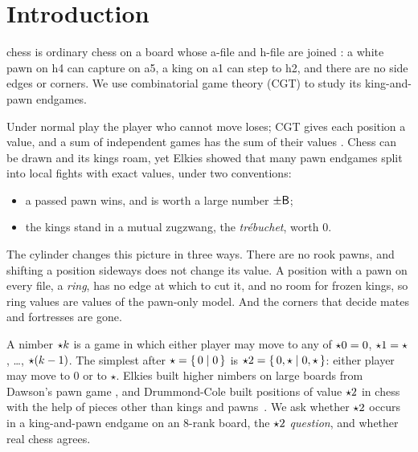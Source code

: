 \section{Introduction}\label{sec:intro}

 chess is ordinary chess on a board whose a-file and h-file are joined
\cite{Pritchard}: a white pawn on h4 can capture on a5, a king on a1 can step to h2, and there are no side edges or
corners. We use combinatorial game theory (CGT) to study its king-and-pawn endgames.

Under normal play the player who cannot move loses; CGT gives each position a value, and a sum of independent
games has the sum of their values \cite{ONAG,WinningWays,Siegel2013}. Chess can be drawn and its kings roam,
yet Elkies \cite{Elkies1996} showed that many pawn endgames split into local fights with exact values, under
two conventions:
\begin{itemize}
\item a passed pawn wins, and is worth a large number $\pm\mathsf{B}$;
\item the kings stand in a mutual zugzwang, the \emph{tr\'ebuchet}, worth $0$.
\end{itemize}

The cylinder changes this picture in three ways. There are no rook pawns, and shifting a position sideways
does not change its value. A position with a pawn on every file, a \emph{ring}, has no edge at which to cut
it, and no room for frozen kings, so ring values are values of the pawn-only model. And the corners that decide mates and fortresses are gone.

A nimber $\mathord{\star k}$ is a game in which either player may move to any of $\mathord{\star0}=0$, $\mathord{\star1}=\star$,
\dots, $\mathord{\star(k-1)}$. The simplest after $\star=\{\,0 \mid 0\,\}$ is $\mathord{\star2}=\{\,0,\star \mid 0,\star\,\}$: either player
may move to $0$ or to $\star$. Elkies built higher nimbers on large boards from Dawson's pawn game \cite{Elkies2002,Dawson1935}, and
Drummond-Cole built positions of value $\mathord{\star2}$ in chess with the help of pieces other than kings and
pawns~\cite{DrummondCole2005}. We ask whether $\mathord{\star2}$ occurs in a king-and-pawn endgame on an 8-rank board,
the \emph{$\mathord{\star2}$ question}, and whether real chess agrees.

